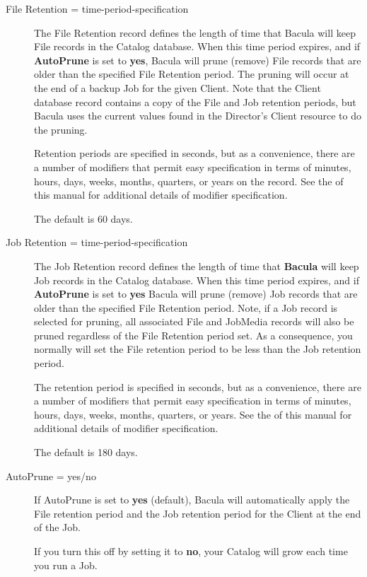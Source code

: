 \begin{description}

\item [File Retention = \lt{}time-period-specification\gt{}]
   The  File Retention record defines the length of time that  Bacula will keep
File records in the Catalog database.  When this time period expires, and if
{\bf AutoPrune} is set to  {\bf yes}, Bacula will prune (remove) File records
that  are older than the specified File Retention period. The pruning  will
occur at the end of a backup Job for the given Client.  Note that the Client
database record contains a copy of the  File and Job retention periods, but
Bacula uses the  current values found in the Director's Client resource to  do
the pruning.  

Retention periods are specified in seconds, but as  a convenience, there are a
number of modifiers that permit easy  specification in terms of minutes,
hours, days, weeks, months,  quarters, or years on the record.  See the 
 of this manual for
additional details of  modifier specification.  

The default is 60 days.  

\item [Job Retention = \lt{}time-period-specification\gt{}]
   The Job  Retention record defines the length of time that {\bf Bacula}  will
keep Job records in the Catalog database. When this time  period expires, and
if {\bf AutoPrune} is set to {\bf yes}  Bacula will prune (remove) Job records
that are older than  the specified File Retention period. Note, if a Job
record is  selected for pruning, all associated File and JobMedia records 
will also be pruned regardless of the File Retention period set.  As a
consequence, you normally will set the File retention period  to be less than
the Job retention period.  

The retention period is specified in seconds, but as  a convenience, there are
a number of modifiers that permit easy  specification in terms of minutes,
hours, days, weeks, months,  quarters, or years.  See the 
 of this manual for
additional details of  modifier specification.  

The default is 180 days.  

\item [AutoPrune = \lt{}yes/no\gt{}]
   If AutoPrune is set to  {\bf yes} (default), Bacula will  automatically apply
the File retention period and the Job  retention period for the Client at the
end of the Job.  

If you turn this off by setting it to {\bf no}, your  Catalog will grow each
time you run a Job. 
\end{description}

